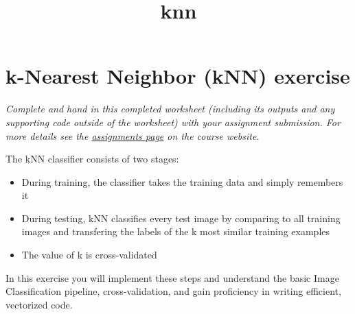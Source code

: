 \documentclass[11pt]{article}
\title{knn}
\providecommand{\tightlist}{%
      \setlength{\itemsep}{0pt}\setlength{\parskip}{0pt}}
\begin{document}
    
    
    \maketitle
    
    

    
    \section{k-Nearest Neighbor (kNN)
exercise}\label{k-nearest-neighbor-knn-exercise}

\emph{Complete and hand in this completed worksheet (including its
outputs and any supporting code outside of the worksheet) with your
assignment submission. For more details see the
\href{http://vision.stanford.edu/teaching/cs231n/assignments.html}{assignments
page} on the course website.}

The kNN classifier consists of two stages:

\begin{itemize}
\tightlist
\item
  During training, the classifier takes the training data and simply
  remembers it
\item
  During testing, kNN classifies every test image by comparing to all
  training images and transfering the labels of the k most similar
  training examples
\item
  The value of k is cross-validated
\end{itemize}

In this exercise you will implement these steps and understand the basic
Image Classification pipeline, cross-validation, and gain proficiency in
writing efficient, vectorized code.
\end{document}
